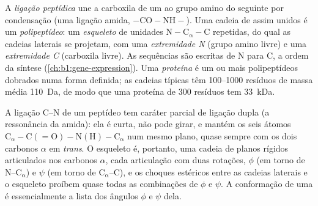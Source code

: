 \begin{definition}\label{def:b1:proteins:peptide}
A \emph{ligação peptídica} une a carboxila de
um  ao grupo amino do seguinte por condensação (uma ligação
amida, $\mathrm{-CO{-}NH-}$). Uma cadeia de  assim unidos é
um \emph{polipeptídeo}: um \emph{esqueleto} de
unidades $\mathrm{N{-}C_\alpha{-}C}$ repetidas, do qual as cadeias
laterais se projetam, com uma \emph{extremidade N} (grupo amino livre) e
uma \emph{extremidade C} (carboxila livre). As sequências são escritas
de N para C, a ordem da síntese (\cref{ch:b1:gene-expression}). Uma
\emph{proteína} é um ou mais polipeptídeos dobrados numa
forma definida; as cadeias típicas têm \qtyrange{100}{1000}{} resíduos
de massa média \qty{110}{Da}, de modo que uma proteína de \qty{300}{}
resíduos tem \qty{33}{kDa}.
\end{definition}

\begin{proposition}\label{prop:b1:proteins:geometry}
A ligação C--N de um peptídeo tem caráter parcial de ligação dupla (a
ressonância da amida): ela é curta, não pode girar, e mantém os seis
átomos $\mathrm{C_\alpha{-}C(=O){-}N(H){-}C_\alpha}$ num mesmo plano,
quase sempre com os dois carbonos $\alpha$ em \emph{trans}. O esqueleto
é, portanto, uma cadeia de planos rígidos articulados nos carbonos
$\alpha$, cada articulação com duas rotações, $\phi$ (em torno de
N--$\mathrm{C_\alpha}$) e $\psi$ (em torno de $\mathrm{C_\alpha}$--C), e
os choques estéricos entre as cadeias laterais e o esqueleto proíbem
quase todas as combinações de $\phi$ e $\psi$. A conformação de uma
 é essencialmente a lista dos ângulos $\phi$ e $\psi$ dela.
\end{proposition}

